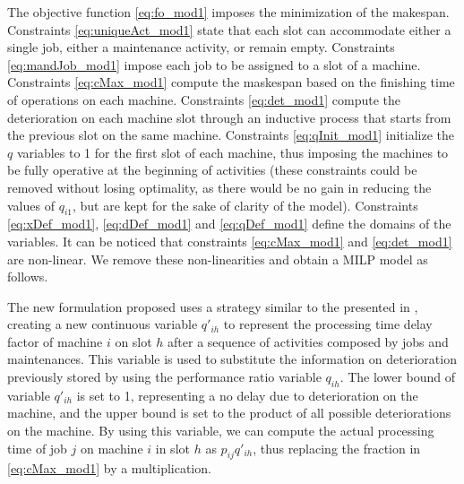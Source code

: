 \documentclass[a4paper,11pt]{article}
\begin{document}
The objective function \eqref{eq:fo_mod1} imposes the minimization of the makespan.  
Constraints \eqref{eq:uniqueAct_mod1} state that each slot can accommodate either a single job, either a maintenance activity, or remain empty. Constraints \eqref{eq:mandJob_mod1} impose each job to be assigned to a slot of a machine. Constraints \eqref{eq:cMax_mod1} compute the maskespan based on the finishing time of operations on each machine. Constraints \eqref{eq:det_mod1} compute the deterioration on each machine slot through an inductive process that starts from the previous slot on the same machine. Constraints \eqref{eq:qInit_mod1} initialize the $q$ variables to 1 for the first slot of each machine, thus imposing the machines to be fully operative at the beginning of activities (these constraints could be removed without losing optimality, as there would be no gain in reducing the values of $q_{i1}$, but are kept for the sake of clarity of the model). Constraints \eqref{eq:xDef_mod1}, \eqref{eq:dDef_mod1} and \eqref{eq:qDef_mod1} define the domains of the variables. It can be noticed that constraints \eqref{eq:cMax_mod1} and \eqref{eq:det_mod1} are non-linear. We remove these non-linearities and obtain a MILP model as follows. 

The new formulation proposed uses a strategy similar to the presented in \cite{deminimizing}, creating a new continuous variable $q'_{ih}$ to represent the processing time delay factor of machine $i$ on slot $h$ after a sequence of activities composed by jobs and maintenances. This variable is used to substitute the information on deterioration previously stored by using the performance ratio variable $q_{ih}$. The lower bound of variable $q'_{ih}$ is set to 1, representing a no delay due to deterioration on the machine, and the upper bound is set to the product of all possible deteriorations on the machine. By using this variable, we can compute the actual processing time of job $j$ on machine $i$ in slot $h$ as $p_{ij}q'_{ih}$, thus replacing the fraction in \eqref{eq:cMax_mod1} by a multiplication. 
\end{document}
